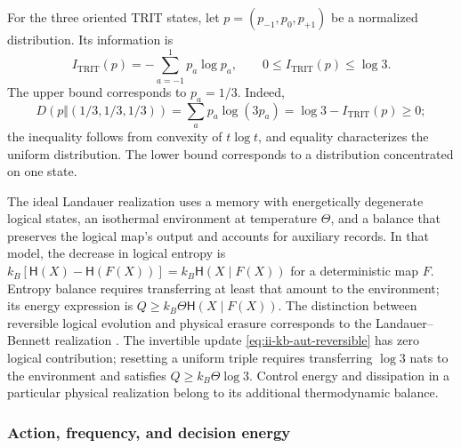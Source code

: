 For the three oriented TRIT states, let
\(p=(p_{-1},p_0,p_{+1})\) be a normalized distribution. Its information is
\begin{equation}
 I_{\mathrm{TRIT}}(p)=-\sum_{a=-1}^{1}p_a\log p_a,
 \qquad 0\leq I_{\mathrm{TRIT}}(p)\leq\log3.
 \label{eq:ii-kb-aut-trit}
\end{equation}
The upper bound corresponds to \(p_a=1/3\). Indeed,
\[
 D(p\Vert(1/3,1/3,1/3))
 =\sum_ap_a\log(3p_a)=\log3-I_{\mathrm{TRIT}}(p)\geq0;
\]
the inequality follows from convexity of \(t\log t\), and
equality characterizes the uniform distribution. The lower bound
corresponds to a distribution concentrated on one state.

The ideal Landauer realization uses a memory with energetically
degenerate logical states, an isothermal environment at temperature \(\Theta\),
and a balance that preserves the logical map's output and accounts for
auxiliary records. In that model, the decrease in logical entropy is
\(k_B[\mathsf H(X)-\mathsf H(F(X))]
=k_B\mathsf H(X\mid F(X))\) for a deterministic map \(F\).
Entropy balance requires transferring at least that amount to the environment;
its energy expression is \(Q\geq k_B\Theta\mathsf H(X\mid F(X))\).
The distinction between reversible logical evolution and physical erasure
corresponds to the Landauer--Bennett realization \cite{bennett2003}.
The invertible update
\eqref{eq:ii-kb-aut-reversible} has zero logical contribution; resetting
a uniform triple requires transferring \(\log3\) nats
to the environment and satisfies \(Q\geq k_B\Theta\log3\).
Control energy and dissipation in a particular physical
realization belong to its additional thermodynamic balance.

\subsubsection{Action, frequency, and decision energy}

